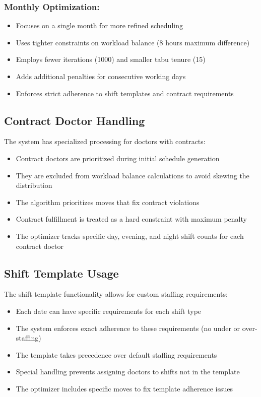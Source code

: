 \documentclass[12pt]{article}
\begin{document}
\subsubsection{Monthly Optimization:}
\begin{itemize}
    \item Focuses on a single month for more refined scheduling
    \item Uses tighter constraints on workload balance (8 hours maximum difference)
    \item Employs fewer iterations (1000) and smaller tabu tenure (15)
    \item Adds additional penalties for consecutive working days
    \item Enforces strict adherence to shift templates and contract requirements
\end{itemize}

\subsection{Contract Doctor Handling}

The system has specialized processing for doctors with contracts:
\begin{itemize}
    \item Contract doctors are prioritized during initial schedule generation
    \item They are excluded from workload balance calculations to avoid skewing the distribution
    \item The algorithm prioritizes moves that fix contract violations
    \item Contract fulfillment is treated as a hard constraint with maximum penalty
    \item The optimizer tracks specific day, evening, and night shift counts for each contract doctor
\end{itemize}

\subsection{Shift Template Usage}

The shift template functionality allows for custom staffing requirements:
\begin{itemize}
    \item Each date can have specific requirements for each shift type
    \item The system enforces exact adherence to these requirements (no under or over-staffing)
    \item The template takes precedence over default staffing requirements
    \item Special handling prevents assigning doctors to shifts not in the template
    \item The optimizer includes specific moves to fix template adherence issues
\end{itemize}
\end{document}
